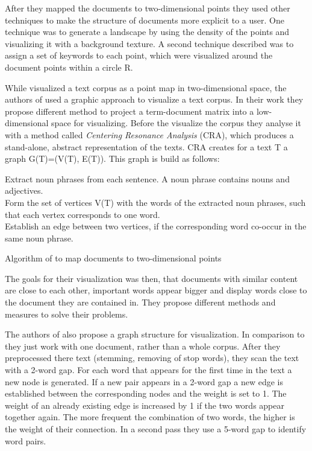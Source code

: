 After they mapped the documents to two-dimensional points they used other techniques to make the structure of documents more explicit to a user. One technique was to generate a landscape by using the density of the points and visualizing it with a  background texture. A second technique described was to assign a set of keywords to each point, which were visualized around the document points within a circle R. 


\newpage
While \cite{journals/informaticaSI/FortunaGM05} visualized a text corpus as a point map in two-dimensional space,  the authors of \cite{doi:10.1117/12.647867} used a graphic approach to visualize a text corpus. In their work they propose different method to project a term-document matrix into a low-dimensional space for visualizing. Before the visualize the corpus they analyse it with a method called \textit{Centering Resonance Analysis} (CRA), which produces a stand-alone, abstract representation of the texts. CRA creates for a text T a graph G(T)=(V(T), E(T)). This graph is build as follows:
\begin{algorithm}
	
	     Extract noun phrases from each sentence. A noun phrase contains nouns and adjectives.  \\
		 Form the set of vertices V(T) with the words of the extracted noun phrases, such that each vertex corresponds to one word. \\ 
		 Establish an edge between two vertices, if the corresponding word co-occur in the same noun phrase.
	
	\caption{Algorithm of \cite{journals/informaticaSI/FortunaGM05} to map documents to two-dimensional points}
\end{algorithm}


The goals for their visualization was then, that documents with similar content are close to each other, important words appear bigger and display words close to the document they are contained in. They propose different methods and measures to solve their problems. 


The authors of \cite{visualiuationCorpus3}  also propose a graph structure for visualization. In comparison to \cite{doi:10.1117/12.647867} they just work with one document, rather than a whole corpus. After they preprocessed there text (stemming, removing of stop words), they scan the text with a 2-word gap. For each word that appears for the first time in the text a new node is generated. If a new pair appears in a 2-word gap a new edge is established between the corresponding nodes and the weight is set to 1. The weight of an already existing edge is increased by 1 if the two words appear together again. The more frequent the combination of two words, the higher is the weight of their connection. In a second pass they use a 5-word gap to identify word pairs.

